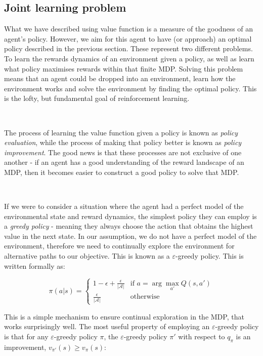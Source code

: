 \documentclass{article}
\begin{document}
\subsection{Joint learning problem}

What we have described using value function is a measure of the goodness of an agent's policy. However, we aim for this agent to have (or approach) an optimal policy described in the previous section. These represent two different problems. To learn the rewards dynamics of an environment given a policy, as well as learn what policy maximises rewards within that finite MDP. Solving this problem means that an agent could be dropped into an environment, learn how the environment works and solve the environment by finding the optimal policy. This is the lofty, but fundamental goal of reinforcement learning.

\

The process of learning the value function given a policy is known as \textit{policy evaluation}, while the process of making that policy better is known as \textit{policy improvement}. The good news is that these processes are not exclusive of one another - if an agent has a good understanding of the reward landscape of an MDP, then it becomes easier to construct a good policy to solve that MDP.

\

If we were to consider a situation where the agent had a perfect model of the environmental state and reward dynamics, the simplest policy they can employ is a \textit{greedy policy} - meaning they always choose the action that obtains the highest value in the next state. In our assumption, we do not have a perfect model of the environment, therefore we need to continually explore the environment for alternative paths to our objective. This is known as a $\varepsilon$-greedy policy. This is written formally as:

\begin{equation}
	\pi(a | s) = \begin{cases}
		1 - \epsilon + \frac{\epsilon}{|\mathcal{A}|} & \text{if } a = \arg \max_{a'} Q(s, a') \\
		\frac{\epsilon}{|\mathcal{A}|} & \text{otherwise}
	\end{cases}
\end{equation}

This is a simple mechanism to ensure continual exploration in the MDP, that works surprisingly well. The most useful property of employing an $\varepsilon$-greedy policy is that for any $\varepsilon$-greedy policy $\pi$, the $\varepsilon$-greedy policy $\pi'$ with respect to $q_\pi$ is an improvement, $v_{\pi'}(s) \geq v_\pi(s)$:
\end{document}
